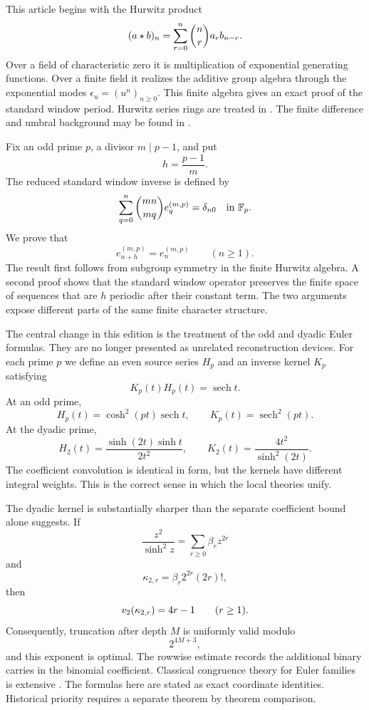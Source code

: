 This article begins with the Hurwitz product
\[
(a\mathbin{\star} b)_n
=
\sum_{r=0}^{n}
\binom nr a_rb_{n-r}.
\]
Over a field of characteristic zero it is multiplication of exponential generating functions. Over a finite field it realizes the additive group algebra through the exponential modes \(\epsilon_u=(u^n)_{n\geq0}\). This finite algebra gives an exact proof of the standard window period. Hurwitz series rings are treated in \cite{Keigher1997,BarberoCerrutiMurru2018}. The finite difference and umbral background may be found in \cite{Roman1984,Comtet1974,GrahamKnuthPatashnik1994}.

Fix an odd prime \(p\), a divisor \(m\mid p-1\), and put
\[
h=\frac{p-1}{m}.
\]
The reduced standard window inverse is defined by
\[
\sum_{q=0}^{n}
\binom{mn}{mq}e_q^{(m,p)}
=
\delta_{n0}
\quad\text{in }\mathbb F_p.
\]
We prove that
\[
e_{n+h}^{(m,p)}=e_n^{(m,p)}
\qquad(n\geq1).
\]
The result first follows from subgroup symmetry in the finite Hurwitz algebra. A second proof shows that the standard window operator preserves the finite space of sequences that are \(h\) periodic after their constant term. The two arguments expose different parts of the same finite character structure.

The central change in this edition is the treatment of the odd and dyadic Euler formulas. They are no longer presented as unrelated reconstruction devices. For each prime \(p\) we define an even source series \(H_p\) and an inverse kernel \(K_p\) satisfying
\[
K_p(t)H_p(t)=\operatorname{sech}t.
\]
At an odd prime,
\[
H_p(t)=\cosh^2(pt)\operatorname{sech}t,
\qquad
K_p(t)=\operatorname{sech}^2(pt).
\]
At the dyadic prime,
\[
H_2(t)=\frac{\sinh(2t)\sinh t}{2t^2},
\qquad
K_2(t)=\frac{4t^2}{\sinh^2(2t)}.
\]
The coefficient convolution is identical in form, but the kernels have different integral weights. This is the correct sense in which the local theories unify.

The dyadic kernel is substantially sharper than the separate coefficient bound alone suggests. If
\[
\frac{z^2}{\sinh^2z}
=
\sum_{r\geq0}\beta_rz^{2r}
\]
and
\[
\kappa_{2,r}=\beta_r2^{2r}(2r)!,
\]
then
\[
v_2(\kappa_{2,r})=4r-1
\qquad(r\geq1).
\]
Consequently, truncation after depth \(M\) is uniformly valid modulo
\[
2^{4M+3},
\]
and this exponent is optimal. The rowwise estimate records the additional binary carries in the binomial coefficient. Classical congruence theory for Euler families is extensive \cite{CarlitzLevine1960,Young1999,Young2001,Sun2008,Chen2004}. The formulas here are stated as exact coordinate identities. Historical priority requires a separate theorem by theorem comparison.

